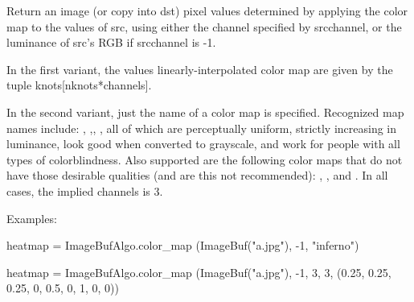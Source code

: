  
Return an image (or copy into {\cf dst}) pixel values determined by applying
the color map to the values of {\cf src}, using either the channel specified
by {\cf srcchannel}, or the luminance of {\cf src}'s RGB if {\cf srcchannel}
is -1.

In the first variant, the values linearly-interpolated color map are
given by the tuple {\cf knots[nknots*channels]}.

In the second variant, just the name of a color map is specified. Recognized
map names include: , ,, ,
all of which are perceptually uniform, strictly increasing in luminance,
look good when converted to grayscale, and work for people with all types of
colorblindness. Also supported are the following color maps that do not have
those desirable qualities (and are this not recommended): ,
, and . In all cases, the implied {\cf channels} is
3.

\smallskip
\noindent Examples:
\begin{code}
    heatmap = ImageBufAlgo.color_map (ImageBuf("a.jpg"), -1, "inferno")

    heatmap = ImageBufAlgo.color_map (ImageBuf("a.jpg"), -1, 3, 3,
                            (0.25, 0.25, 0.25,  0, 0.5, 0,  1, 0, 0))
\end{code}
\apiend


 

